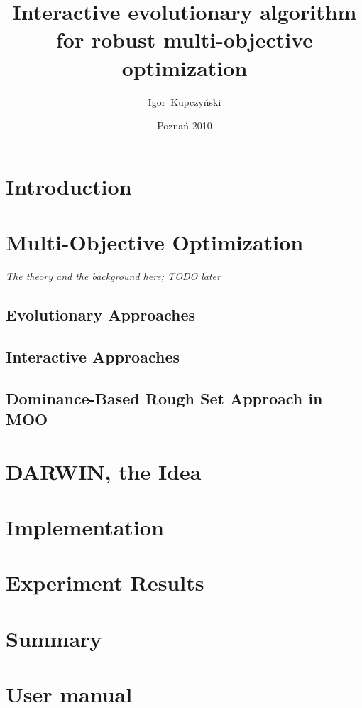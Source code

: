 \documentclass[a4paper,english,thesis]{dcsbook}
\author{Igor~Kupczy\'nski}
\date{Pozna\'n 2010}
\title{Interactive evolutionary algorithm \\ for robust multi-objective
  optimization}
\begin{document}
\maketitle
\frontmatter
\tableofcontents{}
\mainmatter

\chapter{Introduction}

\chapter{Multi-Objective Optimization}
\textit{The theory and the background here; TODO later}
\section{Evolutionary Approaches}
\section{Interactive Approaches}
\section{Dominance-Based Rough Set Approach in MOO}

\chapter{DARWIN, the Idea}

\chapter{Implementation}


\chapter{Experiment Results}


\chapter{Summary}


\backmatter



\appendix
\appendixpage
\addappheadtotoc
\chapter{User manual}
\end{document}
